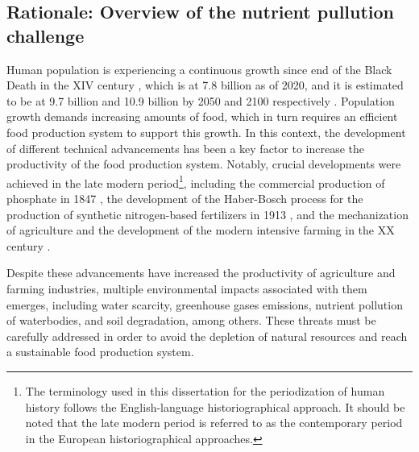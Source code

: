 \begin{refsection}[referencesCh1]

\section{Rationale: Overview of the nutrient pullution challenge}
Human population is experiencing a continuous growth since end of the Black Death in the XIV century \citep{biraben1980essay}, which is at 7.8 billion as of 2020, and it is estimated to be at 9.7 billion and 10.9 billion by 2050 and 2100 respectively \citep{UNPopulationProspects}. Population growth demands increasing amounts of food, which in turn requires an efficient food production system to support this growth. In this context, the development of different technical advancements has been a key factor to increase the productivity of the food production system. Notably, crucial developments were achieved in the late modern period\footnote{The terminology used in this dissertation for the periodization of human history follows the English-language historiographical approach. It should be noted that the late modern period is referred to as the contemporary period in the European historiographical approaches.}, including the commercial production of phosphate in 1847 \citep{Samreen2019}, the development of the Haber-Bosch process for the production of synthetic nitrogen-based fertilizers in 1913 \citep{smil1999detonator}, and the mechanization of agriculture and the development of the modern intensive farming in the XX century \citep{constable2003century,nierenberg2005happier}.

Despite these advancements have increased the productivity of agriculture and farming industries, multiple environmental impacts associated with them emerges, including water scarcity, greenhouse gases emissions, nutrient pollution of waterbodies, and soil degradation, among others. These threats must be carefully addressed in order to avoid the depletion of natural resources and reach a sustainable food production system.


\end{refsection}
